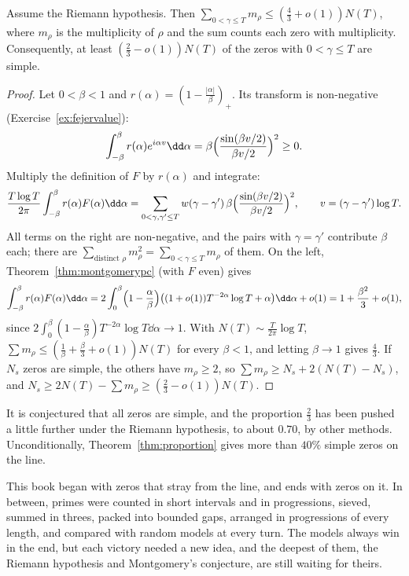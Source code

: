 \begin{corollary}[Montgomery, 1973]\label{cor:simplezeros}
Assume the Riemann hypothesis. Then $\sum_{0<\gamma\le T}m_\rho\le(\frac43+o(1))N(T)$, where $m_\rho$ is the multiplicity of $\rho$ and the sum counts each zero with multiplicity. Consequently, at least $(\frac23-o(1))N(T)$ of the zeros with $0<\gamma\le T$ are simple.
\end{corollary}
\begin{proof}
Let $0<\beta<1$ and $r(\alpha)=(1-\frac{|\alpha|}\beta)_+$. Its transform is non-negative (Exercise~\ref{ex:fejervalue}):
\[
\int_{-\beta}^\beta r(\alpha)e^{i\alpha v}\dd\alpha=\beta\Bigl(\frac{\sin(\beta v/2)}{\beta v/2}\Bigr)^2\ge0.
\]
Multiply the definition of $F$ by $r(\alpha)$ and integrate:
\[
\frac{T\log T}{2\pi}\int_{-\beta}^\beta r(\alpha)F(\alpha)\dd\alpha=\sum_{0<\gamma,\gamma'\le T}w(\gamma-\gamma')\,\beta\Bigl(\frac{\sin(\beta v/2)}{\beta v/2}\Bigr)^2,\qquad v=(\gamma-\gamma')\log T.
\]
All terms on the right are non-negative, and the pairs with $\gamma=\gamma'$ contribute $\beta$ each; there are $\sum_{\text{distinct }\rho}m_\rho^2=\sum_{0<\gamma\le T}m_\rho$ of them. On the left, Theorem~\ref{thm:montgomerypc} (with $F$ even) gives
\[
\int_{-\beta}^\beta r(\alpha)F(\alpha)\dd\alpha=2\int_0^\beta\Bigl(1-\frac\alpha\beta\Bigr)\bigl((1+o(1))T^{-2\alpha}\log T+\alpha\bigr)\dd\alpha+o(1)=1+\frac{\beta^2}3+o(1),
\]
since $2\int_0^\beta(1-\frac\alpha\beta)T^{-2\alpha}\log T\dd\alpha\to1$. With $N(T)\sim\frac T{2\pi}\log T$, $\sum m_\rho\le(\frac1\beta+\frac\beta3+o(1))N(T)$ for every $\beta<1$, and letting $\beta\to1$ gives $\frac43$. If $N_s$ zeros are simple, the others have $m_\rho\ge2$, so $\sum m_\rho\ge N_s+2(N(T)-N_s)$, and $N_s\ge2N(T)-\sum m_\rho\ge(\frac23-o(1))N(T)$.
\end{proof}

It is conjectured that all zeros are simple, and the proportion $\frac23$ has been pushed a little further under the Riemann hypothesis, to about $0.70$, by other methods. Unconditionally, Theorem~\ref{thm:proportion} gives more than $40\%$ simple zeros on the line.

This book began with zeros that stray from the line, and ends with zeros on it. In between, primes were counted in short intervals and in progressions, sieved, summed in threes, packed into bounded gaps, arranged in progressions of every length, and compared with random models at every turn. The models always win in the end, but each victory needed a new idea, and the deepest of them, the Riemann hypothesis and Montgomery's conjecture, are still waiting for theirs.

